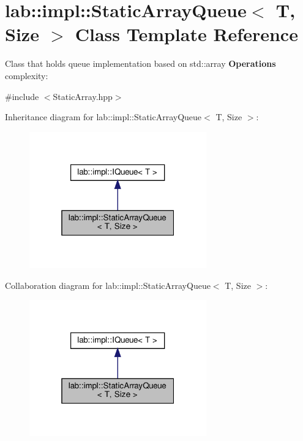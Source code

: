 \hypertarget{classlab_1_1impl_1_1StaticArrayQueue}{}\section{lab\+:\+:impl\+:\+:Static\+Array\+Queue$<$ T, Size $>$ Class Template Reference}
\label{classlab_1_1impl_1_1StaticArrayQueue}


Class that holds queue implementation based on std\+::array {\bfseries Operations} complexity\+:  




{\ttfamily \#include $<$Static\+Array.\+hpp$>$}



Inheritance diagram for lab\+:\+:impl\+:\+:Static\+Array\+Queue$<$ T, Size $>$\+:
\nopagebreak
\begin{figure}[H]
\begin{center}
\leavevmode
\includegraphics[width=217pt]{classlab_1_1impl_1_1StaticArrayQueue__inherit__graph}
\end{center}
\end{figure}


Collaboration diagram for lab\+:\+:impl\+:\+:Static\+Array\+Queue$<$ T, Size $>$\+:
\nopagebreak
\begin{figure}[H]
\begin{center}
\leavevmode
\includegraphics[width=217pt]{classlab_1_1impl_1_1StaticArrayQueue__coll__graph}
\end{center}
\end{figure}
